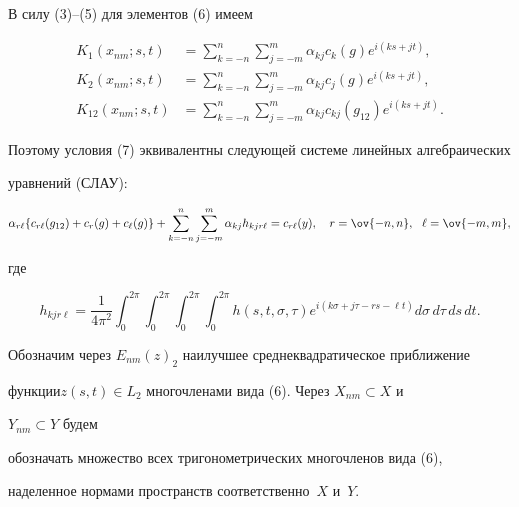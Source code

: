 В силу (3)--(5) для элементов (6) имеем 


\begin{align*} 


K_1(x_{nm};s,t)&=\sum^n_{k=-n}\sum^m_{j=-m} 


\alpha_{kj}c_k(g)e^{i(ks+jt)},\\ 


% 


K_2(x_{nm};s,t)&=\sum^n_{k=-n}\sum^m_{j=-m} 


\alpha_{kj}c_j(g)e^{i(ks+jt)},\\%


K_{12}(x_{nm};s,t)&=\sum^n_{k=-n}\sum^m_{j=-m} 


\alpha_{kj}c_{kj}(g_{12})e^{i(ks+jt)}. 


\end{align*} 


Поэтому условия (7) эквивалентны следующей системе линейных алгебраических  


уравнений (СЛАУ): 


\begin{equation} 


\alpha_{r\ell}\{c_{r\ell}(g_{12})+c_r(g)+c_\ell(g)\}+ 


\sum^n_{k=-n}\sum^m_{j=-m}\alpha_{kj}h_{kjr\ell}= 


c_{r\ell}(y),\quad r=\ov{-n,n},\ \ \ell=\ov{-m,m}, 


\end{equation} 


где 


$$ 


h_{kjr\ell}=\frac{1}{4\pi^2}\int^{2\pi}_0 


\int^{2\pi}_0\int^{2\pi}_0\int^{2\pi}_0 


h(s,t,\sigma,\tau)e^{i(k\sigma+j\tau-rs-\ell t)} 


d\sigma\,d\tau\,ds\,dt. 


$$ 


 


Обозначим через $E_{nm}(z)_2$ наилучшее среднеквадратическое приближение  


функции\linebreak $z(s,t)\in L_2$ многочленами вида (6). Через $X_{nm}\subset X$ и 


$Y_{nm}\subset Y$ будем  


обозначать множество всех тригонометрических многочленов вида (6),  


наделенное нормами пространств соответственно~$X$ и~$Y$. 


